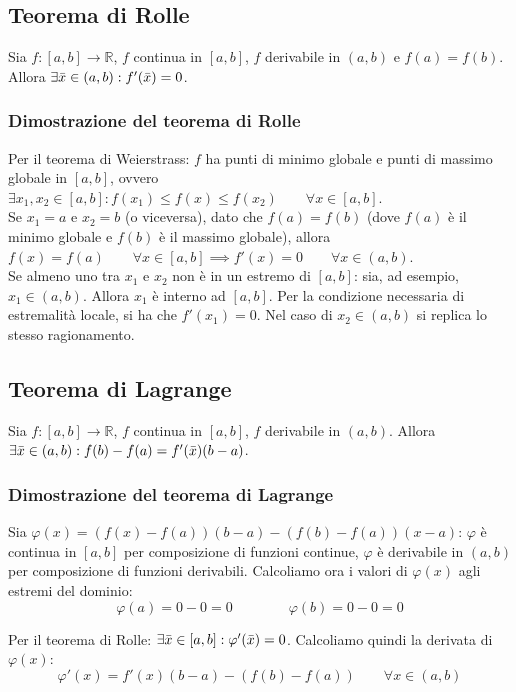 \documentclass{article}
\begin{document}
\subsection{Teorema di Rolle}
Sia $f: [a, b] \xrightarrow{} \mathbb{R}$, $f$ continua in $[a, b]$, $f$ derivabile in $(a, b)$ e $f(a) = f(b)$. Allora $\exists \Bar{x} \in (a, b) : f'(\Bar{x}) = 0$.

\subsubsection{Dimostrazione del teorema di Rolle}
Per il teorema di Weierstrass: $f$ ha punti di minimo globale e punti di massimo globale in $[a, b]$, ovvero $\exists x_1, x_2 \in [a, b] : f(x_1) \leq f(x) \leq f(x_2) \qquad \forall x \in [a, b]$.\\
Se $x_1 = a$ e $x_2 = b$ (o viceversa), dato che $f(a) = f(b)$ (dove $f(a)$ è il minimo globale e $f(b)$ è il massimo globale), allora $f(x) = f(a) \qquad \forall x \in [a, b] \implies f'(x) = 0 \qquad \forall x \in (a, b)$.\\
Se almeno uno tra $x_1$ e $x_2$ non è in un estremo di $[a, b]$: sia, ad esempio, $x_1 \in (a, b)$. Allora $x_1$ è interno ad $[a, b]$. Per la condizione necessaria di estremalità locale, si ha che $f'(x_1) = 0$. Nel caso di $x_2 \in (a, b)$ si replica lo stesso ragionamento.

\subsection{Teorema di Lagrange}
Sia $f: [a, b] \xrightarrow{} \mathbb{R}$, $f$ continua in $[a, b]$, $f$ derivabile in $(a, b)$. Allora $\exists \Bar{x} \in (a, b) : f(b) - f(a) = f'(\Bar{x})(b - a)$.

\subsubsection{Dimostrazione del teorema di Lagrange}
Sia $\varphi(x) = (f(x) - f(a))(b - a) - (f(b) - f(a))(x - a)$: $\varphi$ è continua in $[a, b]$ per composizione di funzioni continue, $\varphi$ è derivabile in $(a, b)$ per composizione di funzioni derivabili. Calcoliamo ora i valori di $\varphi(x)$ agli estremi del dominio:
\begin{equation*}
    \varphi(a) = 0 - 0 = 0 \qquad \qquad \varphi(b) = 0 - 0 = 0
\end{equation*}

\noindent Per il teorema di Rolle: $\exists \Bar{x} \in [a, b] : \varphi'(\Bar{x}) = 0$. Calcoliamo quindi la derivata di $\varphi(x)$:
\begin{equation*}
    \varphi'(x) = f'(x)(b - a) - (f(b) - f(a)) \qquad \forall x \in (a, b)
\end{equation*}
\end{document}
